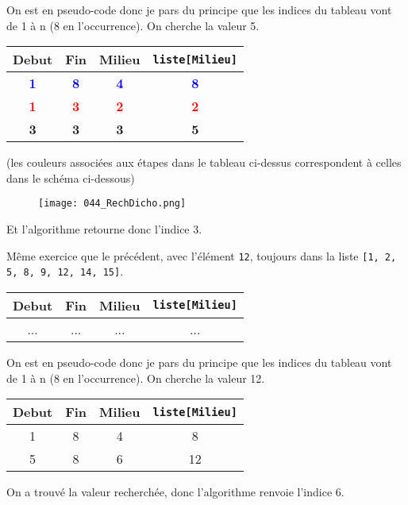 \documentclass[12pt]{article}
\begin{document}
	\begin{MaReponse}
		On est en pseudo-code donc je pars du principe que les indices du tableau vont de 1 à n (8 en l'occurrence). On cherche la valeur 5.
		
		\begin{tabular}{|c|c|c|c|}
			\hline
			\textbf{Debut} & \textbf{Fin} & \textbf{Milieu} & \textbf{\texttt{liste[Milieu]}}\\
			\hline
			\textbf{\textcolor{blue}{1}} & \textbf{\textcolor{blue}{8}} & \textbf{\textcolor{blue}{4}} & \textbf{\textcolor{blue}{8}}\\
			\hline 
			\textbf{\textcolor{red}{1}} & \textbf{\textcolor{red}{3}} & \textbf{\textcolor{red}{2}} & \textbf{\textcolor{red}{2}} \\
			\hline 
			\textbf{\textcolor{mondarkgreen}{3}} & \textbf{\textcolor{mondarkgreen}{3}} & \textbf{\textcolor{mondarkgreen}{3}} & \textbf{\textcolor{mondarkgreen}{5}} \\
			\hline
		\end{tabular}
		
		(les couleurs associées aux étapes dans le tableau ci-dessus correspondent à celles dans le schéma ci-dessous)
		
		\begin{figure}[H]
			\centering
			\texttt{[image: 044\_RechDicho.png]}
		\end{figure}
		
		Et l'algorithme retourne donc l'indice 3.
	\end{MaReponse}
	
	\begin{MonExo}
		Même exercice que le précédent, avec l'élément \texttt{12}, toujours dans la liste \texttt{[1, 2, 5, 8, 9, 12, 14, 15]}.
		
		\begin{tabular}{|c|c|c|c|}
			\hline
			\textbf{Debut} & \textbf{Fin} & \textbf{Milieu} & \textbf{\texttt{liste[Milieu]}}\\
			\hline
			... & ... & ... & ...\\
			\hline 
		\end{tabular}
	\end{MonExo}
	
	\begin{MaReponse}
		On est en pseudo-code donc je pars du principe que les indices du tableau vont de 1 à n (8 en l'occurrence). On cherche la valeur 12.
		
		\begin{tabular}{|c|c|c|c|}
			\hline
			\textbf{Debut} & \textbf{Fin} & \textbf{Milieu} & \textbf{\texttt{liste[Milieu]}}\\
			\hline
			1 & 8 & 4 & 8\\
			\hline 
			5 & 8 & 6 & 12 \\
			\hline 
		\end{tabular}
		
		On a trouvé la valeur recherchée, donc l'algorithme renvoie l'indice 6.
	\end{MaReponse}
	
\end{document}
